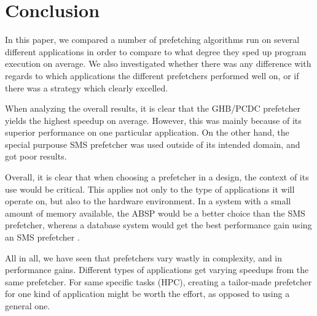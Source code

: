 
\section{Conclusion}
\label{sec:conclusion}

In this paper, we compared a number of prefetching algorithms run on
several different applications in order to compare to what degree they
sped up program execution on average. We also investigated whether
there was any difference with regards to which applications the
different prefetchers performed well on, or if there was a strategy
which clearly excelled.

When analyzing the overall results, it is clear that the GHB/PCDC prefetcher yields the highest speedup on average. However, this was mainly because of its superior performance on one particular application. On the other hand, the special purpouse SMS prefetcher was used outside of its intended domain, and got poor results.  

Overall, it is clear that when choosing a prefetcher in a design, the context of its use would be critical. This applies not only to the type of applications it will operate on, but also to the hardware environment. In a system with a small amount of memory available, the ABSP would be a better choice than the SMS prefetcher, whereas a database system would get the best performance gain using an SMS prefetcher \cite{sms-is-best}. 

All in all, we have seen that prefetchers vary wastly in complexity, and in performance gains. Different types of applications get varying speedups from the same prefetcher. For same specific tasks (HPC), creating a tailor-made prefetcher for one kind of application might be worth the effort, as opposed to using a general one.
